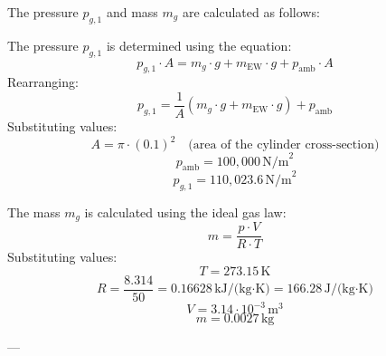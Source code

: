 The pressure \( p_{g,1} \) and mass \( m_g \) are calculated as follows:  

The pressure \( p_{g,1} \) is determined using the equation:  
\[
p_{g,1} \cdot A = m_g \cdot g + m_{\text{EW}} \cdot g + p_{\text{amb}} \cdot A
\]  
Rearranging:  
\[
p_{g,1} = \frac{1}{A} \left( m_g \cdot g + m_{\text{EW}} \cdot g \right) + p_{\text{amb}}
\]  
Substituting values:  
\[
A = \pi \cdot (0.1)^2 \quad \text{(area of the cylinder cross-section)}  
\]  
\[
p_{\text{amb}} = 100,000 \, \text{N/m}^2  
\]  
\[
p_{g,1} = 110,023.6 \, \text{N/m}^2  
\]  

The mass \( m_g \) is calculated using the ideal gas law:  
\[
m = \frac{p \cdot V}{R \cdot T}
\]  
Substituting values:  
\[
T = 273.15 \, \text{K}  
\]  
\[
R = \frac{8.314}{50} = 0.16628 \, \text{kJ/(kg·K)} = 166.28 \, \text{J/(kg·K)}  
\]  
\[
V = 3.14 \cdot 10^{-3} \, \text{m}^3  
\]  
\[
m = 0.0027 \, \text{kg}  
\]  

---